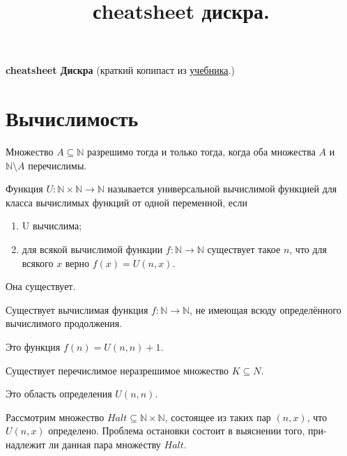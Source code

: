 \documentclass{article}
\title{сheatsheet дискра.}
\newcommand{\N}{\mathbb{N}}
\newenvironment{theorem}[2][Теорема]{\begin{trivlist}
\item[\hskip \labelsep {\bfseries #1}\hskip \labelsep {\bfseries #2.}]}{\end{trivlist}}
\newenvironment{definition}[2][Определение]{\begin{trivlist}
\item[\hskip \labelsep {\bfseries #1}\hskip \labelsep {\bfseries #2}]}{\end{trivlist}}
\begin{document}
{\center \textbf{\LARGE cheatsheet Дискра} (краткий копипаст из \href{http://rubtsov.su/public/hse/2017/DM-HSE-Draft.pdf}{\underline{учебника}}.)}

\section{Вычислимость}
\begin{theorem}{Поста}
Множество $A \subseteq \N$ разрешимо тогда и только
тогда, когда оба множества $A$ и $\N \setminus A$ перечислимы.
\end{theorem}

\begin{definition}{Универсальная вычислимая функция.}
Функция  $U : \N \times \N \to \N$ называется универсальной вычислимой
функцией для класса вычислимых функций от одной переменной, если
\begin{enumerate}
  \item U вычислима;
  \item для всякой вычислимой функции $f : \N \to \N$ существует такое $n$, что для всякого $x$ верно $f(x) = U(n, x)$.
\end{enumerate}

Она существует.
\end{definition}

\begin{theorem}{Функция без всюду
определённого вычислимого продолжения}
Существует вычислимая функция $f : \N \to \N$, не имеющая всюду
определённого вычислимого продолжения.

Это функция $f(n) = U(n, n) + 1$.
\end{theorem}

\begin{theorem}{Перечислимое неразрешимое множество}
Существует перечислимое неразрешимое множество $K \subseteq N$.

Это область определения $U(n, n)$.
\end{theorem}

\begin{definition}{Проблема остановки}
Рассмотрим множество $Halt \subseteq \N \times \N$, состоящее из таких пар
$(n, x)$, что $U(n, x)$ определено. Проблема остановки состоит в выяснении того, при-
надлежит ли данная пара множеству $Halt$.
\end{definition}
\end{document}
